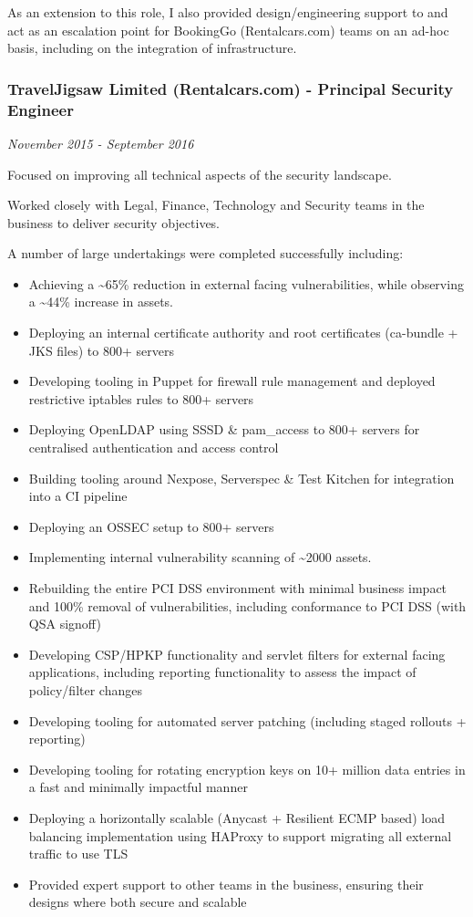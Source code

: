 As an extension to this role, I also provided design/engineering support
to and act as an escalation point for BookingGo (Rentalcars.com) teams
on an ad-hoc basis, including on the integration of infrastructure.

\subsubsection{TravelJigsaw Limited (Rentalcars.com) - Principal
Security
Engineer}\label{traveljigsaw-limited-rentalcars.com---principal-security-engineer}

\emph{November 2015 - September 2016}

Focused on improving all technical aspects of the security landscape.

Worked closely with Legal, Finance, Technology and Security teams in the
business to deliver security objectives.

A number of large undertakings were completed successfully including:

\begin{itemize}
\tightlist
\item
  Achieving a \textasciitilde{}65\% reduction in external facing
  vulnerabilities, while observing a \textasciitilde{}44\% increase in
  assets.
\item
  Deploying an internal certificate authority and root certificates
  (ca-bundle + JKS files) to 800+ servers
\item
  Developing tooling in Puppet for firewall rule management and deployed
  restrictive iptables rules to 800+ servers
\item
  Deploying OpenLDAP using SSSD \& pam\_access to 800+ servers for
  centralised authentication and access control
\item
  Building tooling around Nexpose, Serverspec \& Test Kitchen for
  integration into a CI pipeline
\item
  Deploying an OSSEC setup to 800+ servers
\item
  Implementing internal vulnerability scanning of \textasciitilde{}2000
  assets.
\item
  Rebuilding the entire PCI DSS environment with minimal business impact
  and 100\% removal of vulnerabilities, including conformance to PCI DSS
  (with QSA signoff)
\item
  Developing CSP/HPKP functionality and servlet filters for external
  facing applications, including reporting functionality to assess the
  impact of policy/filter changes
\item
  Developing tooling for automated server patching (including staged
  rollouts + reporting)
\item
  Developing tooling for rotating encryption keys on 10+ million data
  entries in a fast and minimally impactful manner
\item
  Deploying a horizontally scalable (Anycast + Resilient ECMP based)
  load balancing implementation using HAProxy to support migrating all
  external traffic to use TLS
\item
  Provided expert support to other teams in the business, ensuring their
  designs where both secure and scalable
\end{itemize}

